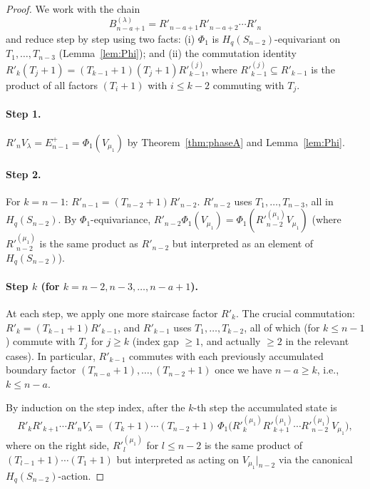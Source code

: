 \documentclass[11pt]{article}
\theoremstyle{definition}
\begin{document}
\begin{proof}
We work with the chain
\[
   B_{n-a+1}^{(\lambda)} = R'_{n-a+1}R'_{n-a+2}\cdots R'_n
\]
and reduce step by step using two facts:
(i) $\Phi_1$ is $H_q(S_{n-2})$-equivariant on $T_1,\ldots,T_{n-3}$
(Lemma~\ref{lem:Phi}); and (ii) the commutation identity
$R'_k(T_j{+}1)=(T_{k-1}{+}1)(T_j{+}1)R'_{k-1}^{(j)}$, where
$R'_{k-1}^{(j)}\subseteq R'_{k-1}$ is the product of all factors
$(T_i{+}1)$ with $i\le k-2$ commuting with $T_j$.

\paragraph{Step 1.}  $R'_n V_\lambda=E_{n-1}^+=\Phi_1(V_{\mu_1})$
by Theorem~\ref{thm:phaseA} and Lemma~\ref{lem:Phi}.

\paragraph{Step 2.}  For $k=n-1$: $R'_{n-1}=(T_{n-2}{+}1)R'_{n-2}$.
$R'_{n-2}$ uses $T_1,\ldots,T_{n-3}$, all in $H_q(S_{n-2})$.  By
$\Phi_1$-equivariance, $R'_{n-2}\Phi_1(V_{\mu_1})=
\Phi_1(R'^{(\mu_1)}_{n-2}V_{\mu_1})$ (where $R'^{(\mu_1)}_{n-2}$
is the same product as $R'_{n-2}$ but interpreted as an element
of $H_q(S_{n-2})$).

\paragraph{Step $k$ (for $k=n-2,n-3,\ldots,n-a+1$).}  At each
step, we apply one more staircase factor $R'_k$.  The crucial
commutation:  $R'_k=(T_{k-1}{+}1)R'_{k-1}$, and $R'_{k-1}$ uses
$T_1,\ldots,T_{k-2}$, all of which (for $k\le n-1$) commute with
$T_j$ for $j\ge k$ (index gap $\ge 1$, and actually $\ge 2$ in
the relevant cases).  In particular, $R'_{k-1}$ commutes with
each previously accumulated boundary factor $(T_{n-a}{+}1),
\ldots,(T_{n-2}{+}1)$ once we have $n-a\ge k$, i.e., $k\le n-a$.

By induction on the step index, after the $k$-th step the
accumulated state is
\begin{equation}\label{eq:step-k}
   R'_k R'_{k+1}\cdots R'_n V_\lambda
   = (T_k{+}1)\cdots(T_{n-2}{+}1)\,
     \Phi_1\big(R'^{(\mu_1)}_k R'^{(\mu_1)}_{k+1}\cdots
       R'^{(\mu_1)}_{n-2} V_{\mu_1}\big),
\end{equation}
where on the right side, $R'^{(\mu_1)}_l$ for $l\le n-2$ is the
same product of $(T_{l-1}{+}1)\cdots(T_1{+}1)$ but interpreted as
acting on $V_{\mu_1}|_{n-2}$ via the canonical
$H_q(S_{n-2})$-action.


\end{proof}
\end{document}
